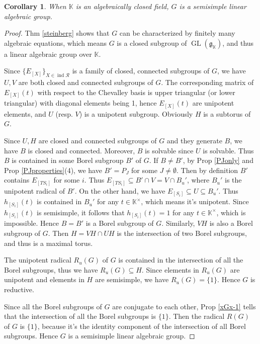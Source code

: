 \documentclass[12pt]{amsart}
\newtheorem{corollary}[theorem]{Corollary}
\begin{document}
\begin{corollary}
    When $\mathbb{K}$ is an algebraically closed field, $G$ is a semisimple linear algebraic group.
\end{corollary}

\begin{proof}
    Thm \ref{steinberg} shows that $G$ can be characterized by finitely many algebraic equations, which means $G$ is a closed subgroup of $\operatorname{GL}(\mathfrak{g}_{\mathbb{K}})$, and thus a linear algebraic group over $\mathbb{K}$.

    Since $\{E_{[X]}\}_{X\in \operatorname{ind}\mathcal{R}}$ is a family of closed, connected subgroups of $G$, we have $U,V$ are both closed and connected subgroups of $G$.
    The corresponding matrix of $E_{[X]}(t)$ with respect to the Chevalley basis is upper triangular (or lower triangular) with diagonal elements being 1, hence $E_{[X]}(t)$ are unipotent elements, and $U$ (resp. $V$) is a unipotent subgroup.
    Obviously $H$ is a subtorus of $G$.

    Since $U,H$ are closed and connected subgroups of $G$ and they generate $B$, we have $B$ is closed and connected.
    Moreover, $B$ is solvable since $U$ is solvable. 
    Thus $B$ is contained in some Borel subgroup $B'$ of $G$.
    If $B\neq B'$, by Prop \ref{PJonly} and Prop \ref{PJproperties}(4), we have $B'=P_J$ for some $J\neq \emptyset$.
    Then by definition $B'$ contains $E_{[TS_i]}$ for some $i$.
    Thus $E_{[TS_i]}\subseteq B'\cap V = V \cap B_u'$, where $B_u'$ is the unipotent radical of $B'$.
    On the other hand, we have $E_{[S_i]} \subseteq U \subseteq B_u'$.
    Thus $h_{[S_i]}(t)$ is contained in $B_u'$ for any $t\in \mathbb{K}^{\times}$, which means it's unipotent.
    Since $h_{[S_i]}(t)$ is semisimple, it follows that $h_{[S_i]}(t)=1$ for any $t\in \mathbb{K}^{\times}$, which is impossible.
    Hence $B=B'$ is a Borel subgroup of $G$.
    Similarly, $VH$ is also a Borel subgroup of $G$.
    Then $H=VH\cap UH$ is the intersection of two Borel subgroups, and thus is a maximal torus.

    The unipotent radical $R_u(G)$ of $G$ is contained in the intersection of all the Borel subgroups, thus we have $R_u(G) \subseteq H$. 
    Since elements in $R_u(G)$ are unipotent and elements in $H$ are semisimple, we have $R_u(G)=\{1\}$. 
    Hence $G$ is reductive.

    Since all the Borel subgroups of $G$ are conjugate to each other, Prop \ref{xGx-1} tells that the intersection of all the Borel subgroups is $\{1\}$.
    Then the radical $R(G)$ of $G$ is $\{1\}$, because it's the identity component of the intersection of all Borel subgroups.
    Hence $G$ is a semisimple linear algebraic group.
\end{proof}
\end{document}
